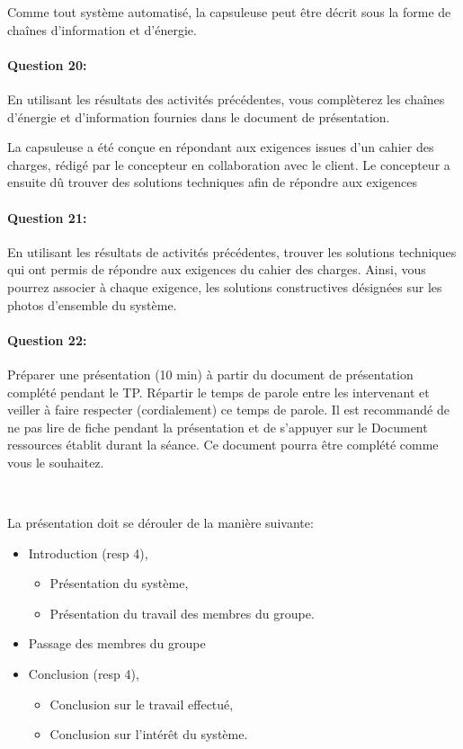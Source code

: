 
Comme tout système automatisé, la capsuleuse peut être décrit sous la forme de chaînes d'information et d'énergie.

\paragraph{Question 20:} En utilisant les résultats des activités précédentes, vous complèterez les chaînes d'énergie et d'information fournies dans le document de présentation.

La capsuleuse a été conçue en répondant aux exigences issues d'un cahier des charges, rédigé par le concepteur en collaboration avec le client. Le concepteur a ensuite dû trouver des solutions techniques afin de répondre aux exigences 

\paragraph{Question 21:} En utilisant les résultats de activités précédentes, trouver les solutions techniques qui ont permis de répondre aux exigences du cahier des charges. Ainsi, vous pourrez associer à chaque exigence, les solutions constructives désignées sur les photos d'ensemble du système.


\paragraph{Question 22:} Préparer une présentation (10 min) à partir du document de présentation complété pendant le TP. Répartir le temps de parole entre les intervenant et veiller à faire respecter (cordialement) ce temps de parole. Il est recommandé de ne pas lire de fiche pendant la présentation et de s'appuyer sur le \og Document ressources \fg établit durant la séance. Ce document pourra être complété comme vous le souhaitez.

~\

La présentation doit se dérouler de la manière suivante:
\begin{itemize}
 \item Introduction (resp 4),
 \begin{itemize}
 \item Présentation du système,
 \item Présentation du travail des membres du groupe.
 \end{itemize}
 \item Passage des membres du groupe
 \item Conclusion (resp 4),
 \begin{itemize}
 \item Conclusion sur le travail effectué,
 \item Conclusion sur l'intérêt du système.
 \end{itemize}
\end{itemize}

